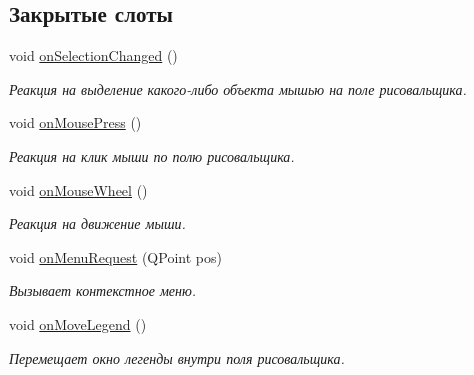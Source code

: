 \subsection*{Закрытые слоты}
\begin{DoxyCompactItemize}
\item 
\hypertarget{class_graph_window_ab41020bb6d02870bd0f2ccca51cb4837}{}\label{class_graph_window_ab41020bb6d02870bd0f2ccca51cb4837} 
void \hyperlink{class_graph_window_ab41020bb6d02870bd0f2ccca51cb4837}{on\+Selection\+Changed} ()
\begin{DoxyCompactList}\small\item\em Реакция на выделение какого-\/либо объекта мышью на поле рисовальщика. \end{DoxyCompactList}\item 
\hypertarget{class_graph_window_a678bb0942c6ca67d1ec366ea6c3f9c8e}{}\label{class_graph_window_a678bb0942c6ca67d1ec366ea6c3f9c8e} 
void \hyperlink{class_graph_window_a678bb0942c6ca67d1ec366ea6c3f9c8e}{on\+Mouse\+Press} ()
\begin{DoxyCompactList}\small\item\em Реакция на клик мыши по полю рисовальщика. \end{DoxyCompactList}\item 
\hypertarget{class_graph_window_a1731d19496de65b3b1a3e125afa8a41a}{}\label{class_graph_window_a1731d19496de65b3b1a3e125afa8a41a} 
void \hyperlink{class_graph_window_a1731d19496de65b3b1a3e125afa8a41a}{on\+Mouse\+Wheel} ()
\begin{DoxyCompactList}\small\item\em Реакция на движение мыши. \end{DoxyCompactList}\item 
void \hyperlink{class_graph_window_a2cc0f9b9b91ccb7c3d203670467a556e}{on\+Menu\+Request} (Q\+Point pos)
\begin{DoxyCompactList}\small\item\em Вызывает контекстное меню. \end{DoxyCompactList}\item 
\hypertarget{class_graph_window_ac8a8d86f74361c73bf0a75254e7ee069}{}\label{class_graph_window_ac8a8d86f74361c73bf0a75254e7ee069} 
void \hyperlink{class_graph_window_ac8a8d86f74361c73bf0a75254e7ee069}{on\+Move\+Legend} ()
\begin{DoxyCompactList}\small\item\em Перемещает окно легенды внутри поля рисовальщика. \end{DoxyCompactList}\item 

\end{DoxyCompactItemize}
